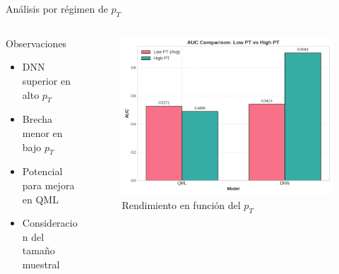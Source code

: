 \documentclass[aspectratio=43]{beamer}
\begin{document}
\begin{frame}{Análisis por régimen de \texorpdfstring{$p_T$}{pT}}
  \begin{columns}
    \begin{column}{0.45\textwidth}
      \begin{alertblock}{Observaciones}
        \begin{itemize}
          \item DNN superior en alto \texorpdfstring{$p_T$}{pT}
          \item Brecha menor en bajo \texorpdfstring{$p_T$}{pT}
          \item Potencial para mejora en QML
          \item Consideracion del tamaño muestral
        \end{itemize}
      \end{alertblock}
    \end{column}
    \begin{column}{0.53\textwidth}
      \begin{figure}
        \includegraphics[width=\textwidth]{resumen_hmmm/auc_low_vs_high_pt.png}
        \caption{\footnotesize Rendimiento en función del \texorpdfstring{$p_T$}{pT}}
      \end{figure}
    \end{column}
  \end{columns}
\end{frame}
\end{document}
